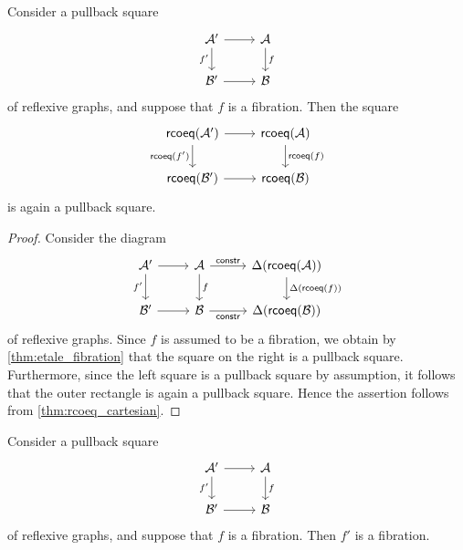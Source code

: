 \begin{prp}
Consider a pullback square
\begin{equation*}
\begin{tikzcd}
\mathcal{A}' \arrow[r] \arrow[d,swap,"{f'}"] & \mathcal{A} \arrow[d,"f"] \\
\mathcal{B}' \arrow[r] & \mathcal{B}
\end{tikzcd}
\end{equation*}
of reflexive graphs, and suppose that $f$ is a fibration. Then the square
\begin{equation*}
\begin{tikzcd}
\rcoeq(\mathcal{A}') \arrow[r] \arrow[d,swap,"\rcoeq({f'})"] & \rcoeq(\mathcal{A}) \arrow[d,"\rcoeq(f)"] \\
\rcoeq(\mathcal{B}') \arrow[r] & \rcoeq(\mathcal{B})
\end{tikzcd}
\end{equation*}
is again a pullback square.
\end{prp}

\begin{proof}
Consider the diagram
\begin{equation*}
\begin{tikzcd}
\mathcal{A}' \arrow[r] \arrow[d,swap,"{f'}"] & \mathcal{A} \arrow[d,"f"] \arrow[r,"\mathsf{constr}"] &[1ex] \Delta(\rcoeq(\mathcal{A})) \arrow[d,"\Delta(\rcoeq(f))"] \\
\mathcal{B}' \arrow[r] & \mathcal{B} \arrow[r,"\mathsf{constr}"'] & \Delta(\rcoeq(\mathcal{B}))
\end{tikzcd}
\end{equation*}
of reflexive graphs. Since $f$ is assumed to be a fibration, we obtain by \cref{thm:etale_fibration} that the square on the right is a pullback square. Furthermore, since the left square is a pullback square by assumption, it follows that the outer rectangle is again a pullback square. Hence the assertion follows from \cref{thm:rcoeq_cartesian}.
\end{proof}

\begin{prp}
Consider a pullback square
\begin{equation*}
\begin{tikzcd}
\mathcal{A}' \arrow[r] \arrow[d,swap,"{f'}"] & \mathcal{A} \arrow[d,"f"] \\
\mathcal{B}' \arrow[r] & \mathcal{B}
\end{tikzcd}
\end{equation*}
of reflexive graphs, and suppose that $f$ is a fibration. Then $f'$ is a fibration.
\end{prp}

